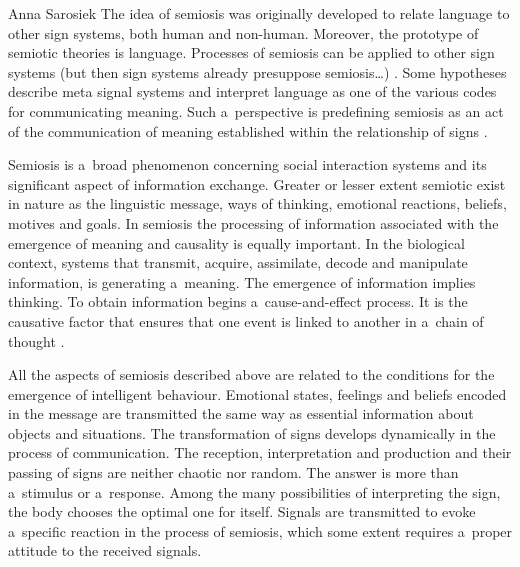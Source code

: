 \begin{artengenv}{Anna Sarosiek}
The idea of semiosis was originally developed to relate language to other sign systems, both human and non-human. Moreover, the prototype of semiotic theories is language. Processes of semiosis can be applied to other sign systems (but then sign systems already presuppose semiosis…)
\parencite[][]{noth_semiotic_2002}. %
 Some hypotheses describe meta signal systems and interpret language as one of the various codes for communicating meaning. Such a~perspective is predefining semiosis as an act of the communication of meaning established within the relationship of signs 
\parencites[][]{bateson_information_1966}[][]{pavlov_conditioned_1927}.%


Semiosis is a~broad phenomenon concerning social interaction systems and its significant aspect of information exchange. Greater or lesser extent semiotic exist in nature as the linguistic message, ways of thinking, emotional reactions, beliefs, motives and goals. In semiosis the processing of information associated with the emergence of meaning and causality is equally important. In the biological context, systems that transmit, acquire, assimilate, decode and manipulate information, is generating a~meaning. The emergence of information implies thinking. To obtain information begins a~cause-and-effect process. It is the causative factor that ensures that one event is linked to another in a~chain of thought
\parencite[][]{pharoah_2020}.%


All the aspects of semiosis described above are related to the conditions for the emergence of intelligent behaviour. Emotional states, feelings and beliefs encoded in the message are transmitted the same way as essential information about objects and situations. The transformation of signs develops dynamically in the process of communication. The reception, interpretation and production and their passing of signs are neither chaotic nor random. The answer is more than a~stimulus or a~response. Among the many possibilities of interpreting the sign, the body chooses the optimal one for itself. Signals are transmitted to evoke a~specific reaction in the process of semiosis, which some extent requires a~proper attitude to the received signals.


\end{artengenv}
